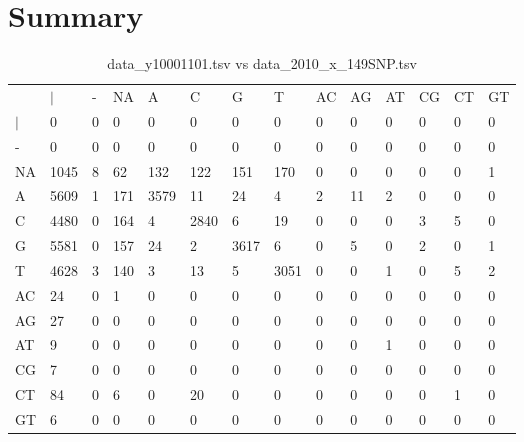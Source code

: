 \section{Summary} \label{section_summary}
\begin{center}
\begin{longtable}{|l|l|l|l|l|l|l|l|l|l|l|l|l|l|}
\caption{data\_y10001101.tsv vs data\_2010\_x\_149SNP.tsv} \label{table_dm0}\\
\hline
\\
\hline
&$|$&-&NA&A&C&G&T&AC&AG&AT&CG&CT&GT\\
$|$&0&0&0&0&0&0&0&0&0&0&0&0&0\\
-&0&0&0&0&0&0&0&0&0&0&0&0&0\\
NA&1045&8&62&132&122&151&170&0&0&0&0&0&1\\
A&5609&1&171&3579&11&24&4&2&11&2&0&0&0\\
C&4480&0&164&4&2840&6&19&0&0&0&3&5&0\\
G&5581&0&157&24&2&3617&6&0&5&0&2&0&1\\
T&4628&3&140&3&13&5&3051&0&0&1&0&5&2\\
AC&24&0&1&0&0&0&0&0&0&0&0&0&0\\
AG&27&0&0&0&0&0&0&0&0&0&0&0&0\\
AT&9&0&0&0&0&0&0&0&0&1&0&0&0\\
CG&7&0&0&0&0&0&0&0&0&0&0&0&0\\
CT&84&0&6&0&20&0&0&0&0&0&0&1&0\\
GT&6&0&0&0&0&0&0&0&0&0&0&0&0\\
\hline
\end{longtable}
\end{center}

